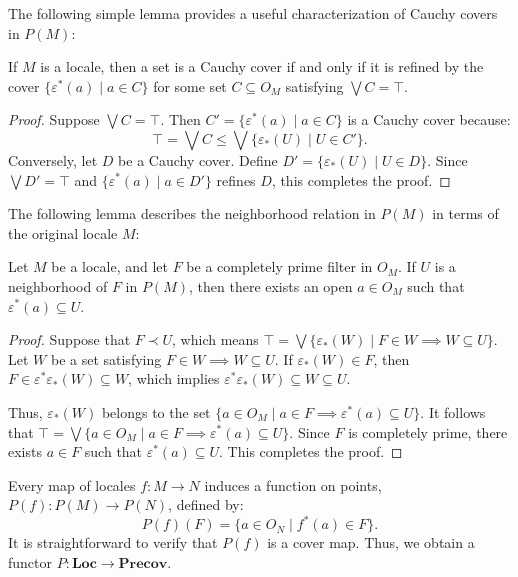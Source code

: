 \documentclass[pdflatex,sn-mathphys-num]{sn-jnl}
\theoremstyle{definition}
\theoremstyle{remark}
\numberwithin{figure}{section}
\newcommand{\rb}{\prec}
\newcommand{\cat}[1]{\mathbf{#1}}
\begin{document}
The following simple lemma provides a useful characterization of Cauchy covers in $P(M)$:

\begin{lem}
If $M$ is a locale, then a set is a Cauchy cover if and only if it is refined by the cover $\{ \varepsilon^*(a) \mid a \in C \}$
for some set $C \subseteq O_M$ satisfying $\bigvee C = \top$.
\end{lem}
\begin{proof}
Suppose $\bigvee C = \top$.
Then $C' = \{ \varepsilon^*(a) \mid a \in C \}$ is a Cauchy cover because:
\[ \top = \bigvee C \leq \bigvee \{ \varepsilon_*(U) \mid U \in C' \}. \]
Conversely, let $D$ be a Cauchy cover.
Define $D' = \{ \varepsilon_*(U) \mid U \in D \}$.
Since $\bigvee D' = \top$ and $\{ \varepsilon^*(a) \mid a \in D' \}$ refines $D$, this completes the proof.
\end{proof}

The following lemma describes the neighborhood relation in $P(M)$ in terms of the original locale $M$:

\begin{lem}
Let $M$ be a locale, and let $F$ be a completely prime filter in $O_M$.
If $U$ is a neighborhood of $F$ in $P(M)$, then there exists an open $a \in O_M$ such that $\varepsilon^*(a) \subseteq U$.
\end{lem}
\begin{proof}
Suppose that ${ F } \rb U$, which means $\top = \bigvee \{ \varepsilon_*(W) \mid F \in W \implies W \subseteq U \}$.
Let $W$ be a set satisfying $F \in W \implies W \subseteq U$.
If $\varepsilon_*(W) \in F$, then $F \in \varepsilon^*\varepsilon_*(W) \subseteq W$, which implies $\varepsilon^*\varepsilon_*(W) \subseteq W \subseteq U$.

Thus, $\varepsilon_*(W)$ belongs to the set $\{ a \in O_M \mid a \in F \implies \varepsilon^*(a) \subseteq U \}$.
It follows that $\top = \bigvee \{ a \in O_M \mid a \in F \implies \varepsilon^*(a) \subseteq U \}$.
Since $F$ is completely prime, there exists $a \in F$ such that $\varepsilon^*(a) \subseteq U$.
This completes the proof.
\end{proof}

Every map of locales $f : M \to N$ induces a function on points, $P(f) : P(M) \to P(N)$, defined by:
\[ P(f)(F) = \{ a \in O_N \mid f^*(a) \in F \}. \]
It is straightforward to verify that $P(f)$ is a cover map.
Thus, we obtain a functor $P : \cat{Loc} \to \cat{Precov}$.
\end{document}
